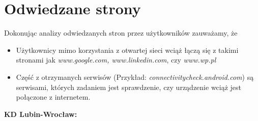 \documentclass[12pt,a4paper]{article}
\begin{document}
    \section{Odwiedzane strony}
        Dokonując analizy odwiedzanych stron przez użytkowników zauważamy, że
            \begin{itemize}
                \item Użytkownicy mimo korzystania z otwartej sieci wciąż łączą się z takimi stronami jak \textit{www.google.com, www.linkedin.com}, czy \textit{www.wp.pl}
                \item Część z otrzymanych serwisów (Przykład: \textit{connectivitycheck.android.com}) są serwisami, których zadaniem jest sprawdzenie, czy urządzenie wciąż jest połączone z internetem.
            \end{itemize}
        \textbf{KD Lubin-Wrocław:}\\
\end{document}
